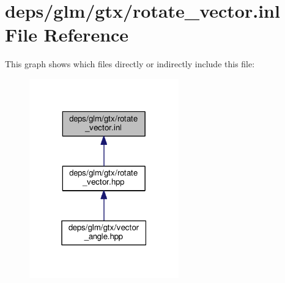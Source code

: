 \hypertarget{rotate__vector_8inl}{}\section{deps/glm/gtx/rotate\+\_\+vector.inl File Reference}
\label{rotate__vector_8inl}
This graph shows which files directly or indirectly include this file\+:
\nopagebreak
\begin{figure}[H]
\begin{center}
\leavevmode
\includegraphics[width=183pt]{d4/daa/rotate__vector_8inl__dep__incl}
\end{center}
\end{figure}
